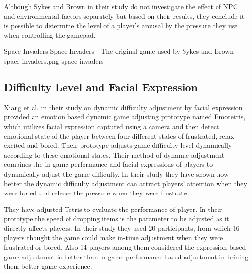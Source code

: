 Although Sykes and Brown in their study do not investigate the effect of NPC and environmental factors separately but based on their results, they conclude it is possible to determine the level of a player's arousal by the pressure they use when controlling the gamepad.

\img
{Space Invaders}
{Space Invaders - The original game used by Sykes and Brown}
{space-invaders.png}
{space-invaders}

\subsection{Difficulty Level and Facial Expression}
Xiang et al. in their study on dynamic difficulty adjustment by facial expression provided an emotion based dynamic game adjusting prototype named Emotetris, which utilizes facial expression captured using a camera and then detect emotional state of the player between four different states of frustrated, relax, excited and bored. Their prototype adjusts game difficulty level dynamically according to these emotional states. Their method of dynamic adjustment combines the in-game performance and facial expressions of players to dynamically adjust the game difficulty. In their study they have shown how better the dynamic difficulty adjustment can attract players' attention when they were bored and release the pressure when they were frustrated.

They have adjusted Tetris to evaluate the performance of player. In their prototype the speed of dropping items is the parameter to be adjusted as it directly affects players. In their study they used 20 participants, from which 16 players thought the game could make in-time adjustment when they were frustrated or bored. Also 14 players among them considered the expression based game adjustment is better than in-game performance based adjustment in brining them better game experience.


